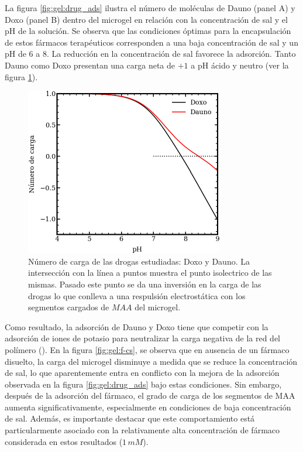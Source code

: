 La figura \ref{fig:gel:drug_ads} ilustra el n\'umero de mol\'eculas de Dauno (panel A) y Doxo (panel B) dentro del microgel en relaci\'on con la concentraci\'on de sal y el pH de la soluci\'on. Se observa que las condiciones \'optimas para la encapsulaci\'on de estos f\'armacos terap\'euticos corresponden a una baja concentraci\'on de sal y un pH de 6 a 8. La reducci\'on en la concentraci\'on de sal favorece la adsorci\'on. Tanto Dauno como Doxo presentan una carga neta de $+1$ a pH \'acido y neutro (ver la figura \ref{fig:gel:carga-drug_ads}).

\begin{figure}[!tb]
	\centering
	\includegraphics[width=0.45\linewidth]{Figures/graph-gel/drugs-Q.pdf}
	\caption{N\'umero de carga de las drogas estudiadas: Doxo y Dauno. La intersecci\'on con la l\'inea a puntos muestra el punto isolectrico de las mismas. Pasado este punto se da una inversi\'on en la carga de las drogas lo que conlleva a una respulsi\'on electrost\'atica con los segmentos cargados de $MAA$ del microgel. }
	\label{fig:gel:carga-drug_ads}
\end{figure}

Como resultado, la adsorci\'on de Dauno y Doxo tiene que competir con la adsorci\'on de iones de potasio para neutralizar la carga negativa de la red del pol\'imero (\citet{PerezChavez2020}). En la figura \ref{fig:gel:f-cs}, se observa que en ausencia de un f\'armaco disuelto, la carga del microgel disminuye a medida que se reduce la concentraci\'on de sal, lo que aparentemente entra en conflicto con la mejora de la adsorci\'on observada en la figura \ref{fig:gel:drug_ads} bajo estas condiciones. Sin embargo, despu\'es de la adsorci\'on del f\'armaco, el grado de carga de los segmentos de MAA aumenta significativamente, especialmente en condiciones de baja concentraci\'on de sal. Adem\'as, es importante destacar que este comportamiento est\'a particularmente asociado con la relativamente alta concentraci\'on de f\'armaco considerada en estos resultados ($1\, mM$).

